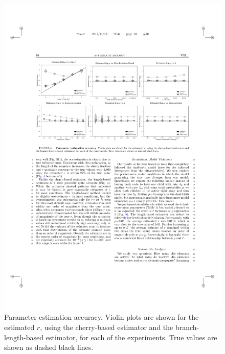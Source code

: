 \begin{figure} %
\centering
\includegraphics[width=\textwidth]{figs/dualbirth-param-est-accuracy}
\caption[Parameter Estimation Accuracy]
{Parameter estimation accuracy. Violin plots are shown for the estimated $r$, using the cherry-based estimator and the branch-length-based estimator, for each of the experiments. True values are shown as dashed black lines.}
\label{fig:dualbirth-param-est-accuracy}
\end{figure}

